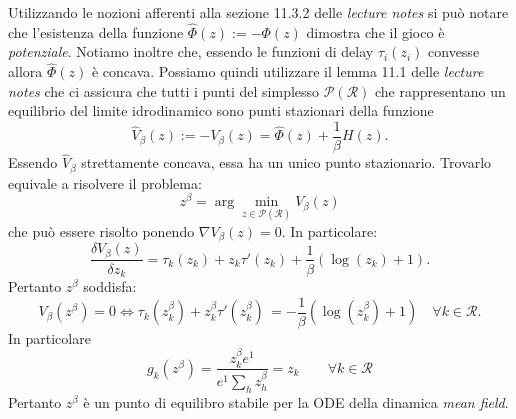 \begin{alphaparts}
    Utilizzando le nozioni afferenti alla sezione 11.3.2 delle \textit{lecture notes} si può notare che l'esistenza della funzione \( \hat{\Phi}(z) := - \Phi(z)\) dimostra che il gioco è \textit{potenziale}. Notiamo inoltre che, essendo le funzioni di delay \(\tau_i(z_i)\) convesse allora \(\hat{\Phi}(z)\) è concava. Possiamo quindi utilizzare il lemma 11.1 delle \textit{lecture notes} che ci assicura che tutti i punti del simplesso \(\mathcal{P}(\mathcal{R})\) che rappresentano un equilibrio del limite idrodinamico sono punti stazionari della funzione 
    \[
     \hat{V}_\beta(z) := - V_\beta(z) = \hat{\Phi}(z) + \frac{1}{\beta}H(z).   
    \]
    Essendo \(\hat{V}_\beta \) strettamente concava, essa ha un unico punto stazionario. Trovarlo equivale a risolvere il problema:
    \begin{equation*}
        z^\beta = \arg\min \limits_{z \in \mathcal{P}(\mathcal{R})} V_\beta(z)
    \end{equation*}
    che può essere risolto ponendo \(\nabla V_\beta(z) = 0 \).
    In particolare:
    \[
    \frac{\delta V_\beta(z)}{\delta z_k} = \tau_{k}(z_{k}) + z_{k}\tau'(z_{k})  + \frac{1}{\beta}(\log(z_k)+ 1).  
    \]
    Pertanto \(z^\beta\) soddisfa:
    \[
        V_\beta(z^\beta) = 0 \iff \tau_{k}(z_{k}^\beta) + z_{k}^\beta\tau'(z_{k}^\beta)\, = - \frac{1}{\beta}(\log(z_k^\beta)+ 1) \quad \forall k \in \mathcal{R}. 
    \]
    In particolare
    \[
        g_k(z^\beta) = \frac{z_k^\beta e^1}{e^1  \sum \limits_{h}^{} z^\beta_h} = z_k \quad \quad \forall k \in \mathcal{R}\]
    Pertanto \(z^\beta\) è un punto di equilibro stabile per la ODE della dinamica \textit{mean field}.
\end{alphaparts}